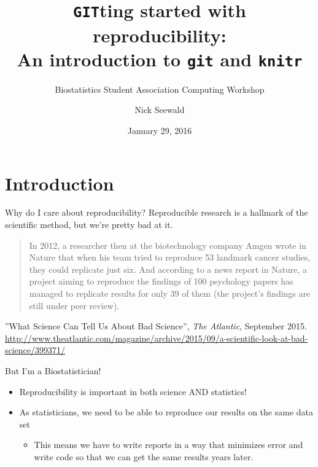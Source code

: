 \documentclass{beamer}
\title[Reproducibility with \texttt{git} and \texttt{knitr}]{\texttt{GIT}ting started with reproducibility: \\ An introduction to \texttt{git} and \texttt{knitr}}
\author{Nick Seewald}
\subtitle{Biostatistics Student Association Computing Workshop}
\institute[University of Michigan]{Department of Statistics \\ University of Michigan}
\date{January 29, 2016}
\begin{document}
	
	\maketitle
	
	\section{Introduction}

	\begin{frame}{Why do I care about reproducibility?}
		Reproducible research is a hallmark of the scientific method, but we're pretty bad at it. 
		
		\begin{quote}
			In 2012, a researcher then at the biotechnology company Amgen wrote in Nature that when his team tried to reproduce 53 landmark cancer studies, they could replicate just six. And according to a news report in Nature, a project aiming to reproduce the findings of 100 psychology papers has managed to replicate results for only 39 of them (the project's findings are still under peer review).
		\end{quote}
		
		\footnotesize{''What Science Can Tell Us About Bad Science'', \textit{The Atlantic}, September 2015.} \scriptsize{\url{http://www.theatlantic.com/magazine/archive/2015/09/a-scientific-look-at-bad-science/399371/}}
	\end{frame}

	\begin{frame}{But I'm a Biostatistician!}
		\begin{itemize}
			\item Reproducibility is important in both science AND statistics!
			\item As statisticians, we need to be able to reproduce our results on the same data set
			\begin{itemize}
				\item This means we have to write reports in a way that minimizes error and write code so that we can get the same results years later.
			\end{itemize}
		\end{itemize}
	\end{frame}
	
\end{document}
